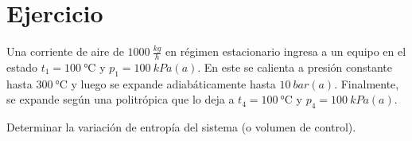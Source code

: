 \section{Ejercicio}\label{ej:Chap07Ejercicio12}
Una corriente de aire de $\SI{1000}{\frac{kg}{h}}$ en régimen estacionario ingresa a un equipo en el estado $t_1=\SI{100}{\celsius}$ y $p_1=\SI{100}{kPa(a)}$. En este se calienta a presión constante hasta $\SI{300}{\celsius}$ y luego se expande adiabáticamente hasta $\SI{10}{bar(a)}$. Finalmente, se expande según una politrópica que lo deja a $t_4=\SI{100}{\celsius}$ y $p_4=\SI{100}{kPa(a)}$.

Determinar la variación de entropía del sistema (o volumen de control).